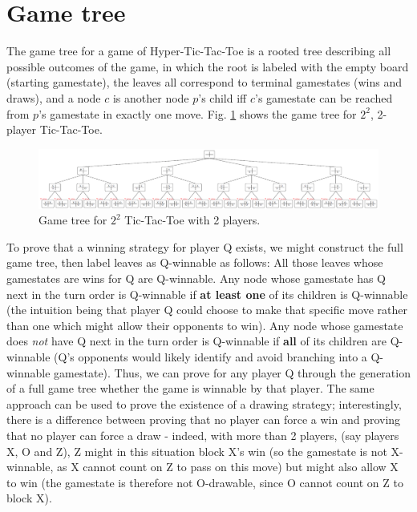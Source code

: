 \documentclass[english, 11pt]{article}
\begin{document}
\section*{Game tree}
The game tree for a game of Hyper-Tic-Tac-Toe is a rooted tree describing all possible outcomes of the game, in which the root is labeled with the empty board (starting gamestate), the leaves all correspond to terminal gamestates (wins and draws), and a node $c$ is another node $p$'s child iff $c$'s gamestate can be reached from $p$'s gamestate in exactly one move. Fig. \ref{fig:fulltree} shows the game tree for $2^2$, 2-player Tic-Tac-Toe. 
\begin{figure}[!h]
	\centering
	\includegraphics[scale=.65]{./img/fulltree.png}
	\caption{Game tree for $2^2$ Tic-Tac-Toe with 2 players.} \label{fig:fulltree}
\end{figure}
To prove that a winning strategy for player Q exists, we might construct the full game tree, then label leaves as Q-winnable as follows:
All those leaves whose gamestates are wins for Q are Q-winnable. 
Any node whose gamestate has Q next in the turn order is Q-winnable if \textbf{at least one} of its children is Q-winnable (the intuition being that player Q could choose to make that specific move rather than one which might allow their opponents to win).
Any node whose gamestate does \textit{not} have Q next in the turn order is Q-winnable if \textbf{all} of its children are Q-winnable (Q's opponents would likely identify and avoid branching into a Q-winnable gamestate). 
Thus, we can prove for any player Q through the generation of a full game tree whether the game is winnable by that player.
The same approach can be used to prove the existence of a drawing strategy; interestingly, there is a difference between proving that no player can force a win and proving that no player can force a draw - indeed, with more than 2 players, (say players X, O and Z), Z might in this situation block X's win (so the gamestate is not X-winnable, as X cannot count on Z to pass on this move) but might also allow X to win (the gamestate is therefore not O-drawable, since O cannot count on Z to block X).  
\end{document}
